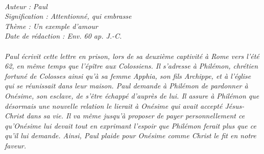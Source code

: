 \BFont
\noindent\hrulefill
{\footnotesize
\textit{
\bigskip
{\centering{}
\\Auteur : Paul
\\Signification : Attentionné, qui embrasse
\\Thème : Un exemple d'amour
\\Date de rédaction : Env. 60 ap. J.-C.\\}
}
\textit{
\\Paul écrivit cette lettre en prison, lors de sa deuxième captivité à Rome vers l’été 62, en même temps que l’épître aux Colossiens. Il s’adresse à Philémon, chrétien fortuné de Colosses ainsi qu’à sa femme Apphia, son fils Archippe, et à l’église qui se réunissait dans leur maison. Paul demande à Philémon de pardonner à Onésime, son esclave, de s’être échappé d’auprès de lui. Il assure à Philémon que désormais une nouvelle relation le lierait à Onésime qui avait accepté Jésus-Christ dans sa vie. Il va même jusqu’à proposer de payer personnellement ce qu’Onésime lui devait tout en exprimant l’espoir que Philémon ferait plus que ce qu’il lui demande. Ainsi, Paul plaide pour Onésime comme Christ le fit en notre faveur.\bigskip
}
}
\par\nobreak\noindent\hrulefill
